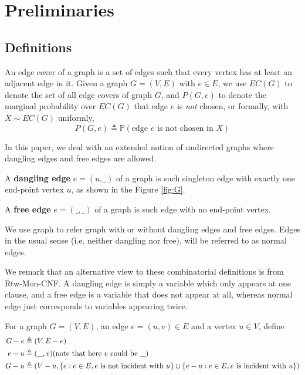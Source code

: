 \section{Preliminaries}
\subsection{Definitions}
An edge cover of a graph is a set of edges such that every vertex has at least an adjacent edge in it.
Given a graph $G=(V,E)$ with $e \in E$,  we use $EC(G)$ to denote the set of all edge covers of graph $G$, and $P(G, e)$ to denote the marginal probability over $EC(G)$ that edge $e$ is \emph{not} chosen, or formally, with $X \sim EC(G)$ uniformly,
\begin{equation}
	P(G, e) \triangleq \mathbb{P} \left(\textrm{edge $e$ is not chosen in $X$} \right)
	\label{defpge}
\end{equation}

In this paper, we deal with an extended notion of undirected graphs where dangling edges and free edges are allowed.
\begin{Def}
	A {\bf dangling edge} $e=(u,\_)$ of a graph is such singleton edge with exactly one end-point vertex $u$, as shown in the Figure \ref{fig:G}.

	A {\bf free edge} $e=(\_, \_)$ of a graph is such edge with no end-point vertex. %


\end{Def}

	We use graph to refer graph with or without dangling edges and free edges.
	Edges in the usual sense (i.e. neither dangling nor free), will be referred to as normal edges.

	We remark that an alternative view to these combinatorial definitions is from Rtw-Mon-CNF.
	A dangling edge is simply a variable which only appears at one clause, and a free edge is a variable
	that does not appear at all, whereas normal edge just corresponds to variables appearing twice.

For a graph $G=(V,E)$, an edge $e = (u,v) \in E$ and a vertex $u \in V$, define
\begin{align*}
G - e &\triangleq (V, E-e) \\
e - u &\triangleq (\_, v) \text{(note that here $v$ could be $\_$)} \\
G - u &\triangleq (V - u, \left\{e: e \in E, e\text{ is not incident with }u\right\} \cup \left\{e - u: e \in E, e\text{ is incident with }u\right\})
\end{align*}

